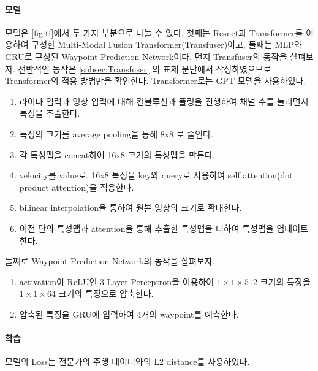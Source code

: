 \paragraph*{모델}
모델은 \autoref{fig:tf}에서 두 가지 부분으로 나눌 수 있다.
첫째는 Resnet과 Transformer를 이용하여 구성한 Multi-Modal Fusion Transformer(Transfuser)이고,
둘째는 MLP와 GRU로 구성된 Waypoint Prediction Network이다.
먼저 Transfuser의 동작을 살펴보자.
전반적인 동작은 \autoref{subsec:Transfuser} 의 표제 문단에서 작성하였으므로 Transformer의 적용 방법만을 확인한다.
Transformer로는 GPT 모델을 사용하였다.
\begin{enumerate}\tightlist
    \item 라이다 입력과 영상 입력에 대해 컨볼루션과 풀링을 진행하여 채널 수를 늘리면서 특징을 추출한다.
    \item 특징의 크기를 average pooling을 통해 8x8 로 줄인다.
    \item 각 특성맵을 concat하여 16x8 크기의 특성맵을 만든다.
    \item velocity를 value로, 16x8 특징을 key와 query로 사용하여 self attention(dot product attention)을 적용한다.
    \item bilinear interpolation을 통하여 원본 영상의 크기로 확대한다.
    \item 이전 단의 특성맵과 attention을 통해 추출한 특성맵을 더하여 특성맵을 업데이트한다.
\end{enumerate}
둘째로 Waypoint Prediction Network의 동작을 살펴보자.
\begin{enumerate}\tightlist
    \item activation이 ReLU인 3-Layer Perceptron을 이용하여
    $1 \times 1 \times 512$ 크기의 특징을
    $1 \times 1 \times 64$ 크기의 특징으로 압축한다.
    \item 압축된 특징을 GRU에 입력하여 4개의 waypoint를 예측한다.
\end{enumerate}
\paragraph*{학습}
모델의 Loss는 전문가의 주행 데이터와의 L2 distance를 사용하였다. 

